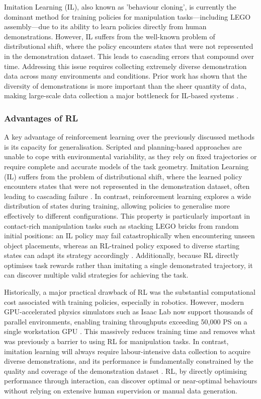\documentclass[12pt,a4paper,oneside]{report}
\begin{document}
Imitation Learning (IL), also known as 'behaviour cloning', is currently the dominant method for training policies for manipulation tasks---including LEGO assembly---due to its ability to learn policies directly from human demonstrations. However, IL suffers from the well-known problem of distributional shift, where the policy encounters states that were not represented in the demonstration dataset. This leads to cascading errors that compound over time. Addressing this issue requires collecting extremely diverse demonstration data across many environments and conditions. Prior work has shown that the diversity of demonstrations is more important than the sheer quantity of data, making large-scale data collection a major bottleneck for IL-based systems \cite{openaiLearningDexterousInHand2019b}. 

\subsubsection{Advantages of RL}
A key advantage of reinforcement learning over the previously discussed methods is its capacity for generalisation. Scripted and planning-based approaches are unable to cope with environmental variability, as they rely on fixed trajectories or require complete and accurate models of the task geometry. Imitation Learning (IL) suffers from the problem of distributional shift, where the learned policy encounters states that were not represented in the demonstration dataset, often leading to cascading failure \cite{argallSurveyRobotLearning2009, openaiLearningDexterousInHand2019b}. In contrast, reinforcement learning explores a wide distribution of states during training, allowing policies to generalise more effectively to different configurations. This property is particularly important in contact-rich manipulation tasks such as stacking LEGO bricks from random initial positions: an IL policy may fail catastrophically when encountering unseen object placements, whereas an RL-trained policy exposed to diverse starting states can adapt its strategy accordingly \cite{chengZeroshotSimtorealTransfer2023}. Additionally, because RL directly optimises task rewards rather than imitating a single demonstrated trajectory, it can discover multiple valid strategies for achieving the task.

Historically, a major practical drawback of RL was the substantial computational cost associated with training policies, especially in robotics. However, modern GPU-accelerated physics simulators such as Isaac Lab now support thousands of parallel environments, enabling training throughputs exceeding 50,000 PS on a single workstation GPU \cite{nvidiaIsaacLabUnified2024}. This massively reduces training time and removes what was previously a barrier to using RL for manipulation tasks. In contrast, imitation learning will always require labour-intensive data collection to acquire diverse demonstrations, and its performance is fundamentally constrained by the quality and coverage of the demonstration dataset \cite{argallSurveyRobotLearning2009, openaiLearningDexterousInHand2019b}. RL, by directly optimising performance through interaction, can discover optimal or near-optimal behaviours without relying on extensive human supervision or manual data generation.
\end{document}
